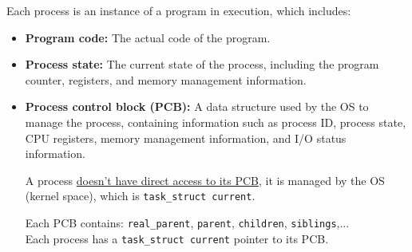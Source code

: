 \documentclass[openany,12pt]{book}
\newcommand{\code}[1]{\texttt{#1}}
\begin{document}
\begin{center}
  \begin{minipage}[t]{0.6\textwidth}
    \vspace{0pt} %
    Each process is an instance of a program in execution, which includes:
    \begin{itemize}
      \item \textbf{Program code:} The actual code of the program.
      \item \textbf{Process state:} The current state of the process, including the program counter, registers, and memory management information.
      \item \textbf{Process control block (PCB):} A data structure used by the OS to manage the process, containing information such as process ID, process state, CPU registers, memory management information, and I/O status information.

            A process \ul{doesn't have direct access to its PCB}, it is managed by the OS (kernel space), which is \code{task\_struct current}.

            Each PCB contains: \code{real\_parent}, \code{parent}, \code{children}, \code{siblings},...\\
            Each process has a \code{task\_struct current} pointer to its PCB.


\end{itemize}
\end{minipage}
\end{center}
\end{document}
